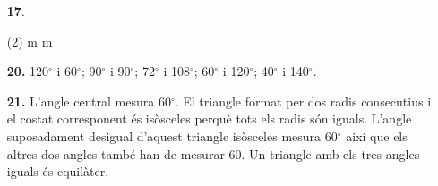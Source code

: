 \documentclass[a4paper, pdf, twoside]{book}
\begin{document}
\begin{multicols}{2}
\begin{enumerate}
 \item[\fontfamily{phv}\selectfont\color{blue}\textbf{17}. ] 
 \begin{tasks}[column-sep=1em, item-indent=1.3333em](2)
	  m
	  m
\end{tasks}
\vspace{0.25cm}
\item[\fontfamily{phv}\selectfont\color{blue}\textbf{20. }] 
120${}^\circ $ i 60${}^\circ $; 90${}^\circ $ i 90${}^\circ $; 72${}^\circ $ i 108${}^\circ $; 60${}^\circ $ i 120${}^\circ $; 40${}^\circ $ i 140${}^\circ $.
\vspace{0.25cm}
\item[\fontfamily{phv}\selectfont\color{blue}\textbf{21. }] 
 L'angle central mesura 60${}^\circ $. El triangle format per dos radis consecutius i el costat corresponent és isòsceles perquè tots els radis són iguals. L'angle suposadament desigual d'aquest triangle isòsceles mesura 60${}^\circ $ així que els altres dos angles també han de mesurar 60. Un triangle amb els tres angles iguals és equilàter.
 \end{enumerate}
\vspace{0.3cm}



\end{multicols}
\end{document}
